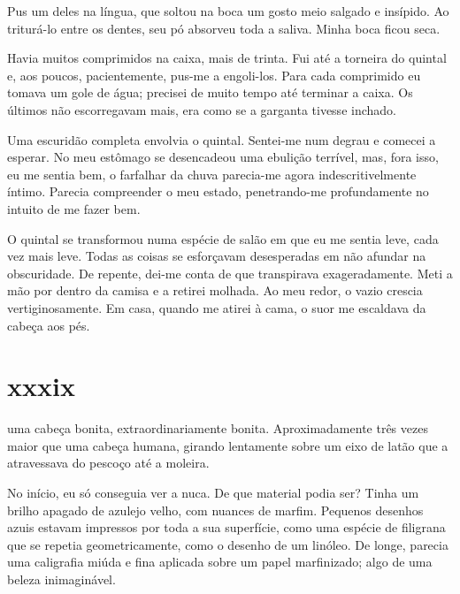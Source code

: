Pus um deles na língua, que soltou na boca um gosto meio salgado e insípido.
Ao triturá-lo entre os dentes, seu pó absorveu toda a saliva. Minha boca
ficou seca.

Havia muitos comprimidos na caixa, mais de trinta. Fui até a torneira do
quintal e, aos poucos, pacientemente, pus-me a engoli-los. Para cada
comprimido eu tomava um gole de água; precisei de muito tempo até terminar a
caixa. Os últimos não escorregavam mais, era como se a garganta tivesse
inchado.

Uma escuridão completa envolvia o quintal. Sentei-me num degrau e comecei a
esperar. No meu estômago se desencadeou uma ebulição terrível, mas, fora
isso, eu me sentia bem, o farfalhar da chuva parecia-me agora
indescritivelmente íntimo. Parecia compreender o meu estado, penetrando-me
profundamente no intuito de me fazer bem.

O quintal se transformou numa espécie de salão em que eu me sentia leve, cada
vez mais leve. Todas as coisas se esforçavam desesperadas em não afundar na
obscuridade. De repente, dei-me conta de que transpirava exageradamente. Meti
a mão por dentro da camisa e a retirei molhada. Ao meu redor, o vazio crescia
vertiginosamente. Em casa, quando me atirei à cama, o suor me escaldava da
cabeça aos pés.


\section{xxxix} 

 uma cabeça bonita, extraordinariamente bonita. Aproximadamente três vezes maior que uma cabeça humana, girando lentamente sobre um eixo de latão que a atravessava do pescoço até a moleira. 

No início, eu só conseguia ver a nuca. De que material podia ser? Tinha um
brilho apagado de azulejo velho, com nuances de marfim. Pequenos desenhos
azuis estavam impressos por toda a sua superfície, como uma espécie de
filigrana que se repetia geometricamente, como o desenho de um linóleo. De
longe, parecia uma caligrafia miúda e fina aplicada sobre um papel
marfinizado; algo de uma beleza inimaginável.



